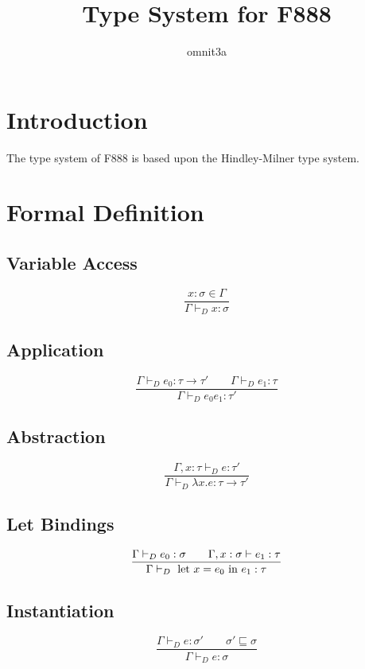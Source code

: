 \documentclass{article}
\title{Type System for F888}
\author{omnit3a}
\begin{document}
\maketitle

\section{Introduction}
The type system of F888 is based upon the Hindley-Milner type system.

\section{Formal Definition}
\subsection{Variable Access}
\begin{equation}
	\frac
		{x:\sigma \in \Gamma}
		{\Gamma \vdash _{D} x : \sigma}
\end{equation}

\subsection{Application}
\begin{equation}
	\frac 
		{\Gamma \vdash _{D} e_{0}: \tau \rightarrow \tau' \qquad \Gamma \vdash _{D} e_{1} : \tau}
		{\Gamma \vdash _{D} e_{0} e_{1} : \tau'}
\end{equation}

\subsection{Abstraction}
\begin{equation}
	\frac
		{\Gamma, x : \tau \vdash _{D} e : \tau'}
		{\Gamma \vdash _{D} \lambda x.e:\tau \rightarrow \tau'}
\end{equation}

\subsection{Let Bindings}
\begin{equation}
	\frac
		{\Gamma \vdash _{D} e_{0} : \sigma \qquad \Gamma, x:\sigma \vdash e_{1}:\tau}
		{\Gamma \vdash _{D} \textup{ let }x = e_{0} \textup{ in }e_{1}:\tau}
\end{equation}

\subsection{Instantiation}
\begin{equation}
	\frac
		{\Gamma \vdash _{D} e : \sigma' \qquad \sigma' \sqsubseteq \sigma}
		{\Gamma \vdash _{D} e : \sigma}
\end{equation}
\end{document}
